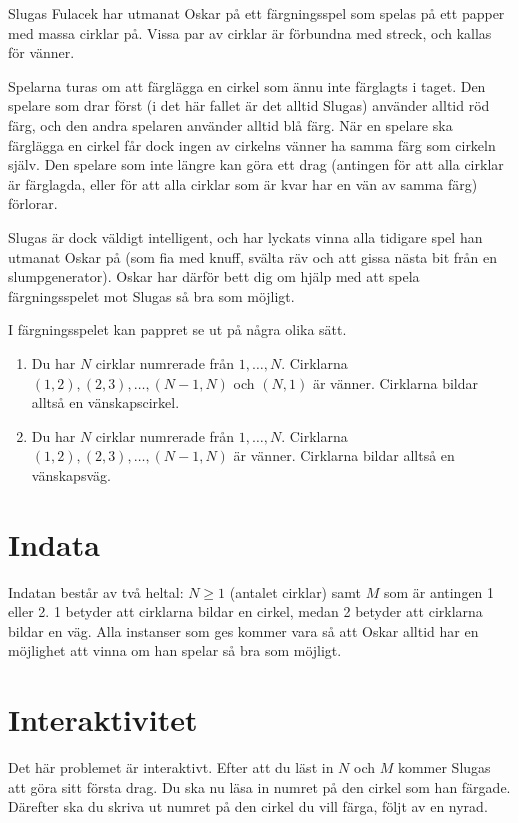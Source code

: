 
Slugas Fulacek har utmanat Oskar på ett färgningsspel som spelas på ett papper med massa cirklar på. Vissa par av cirklar är förbundna med streck, och kallas för vänner.

Spelarna turas om att färglägga en cirkel som ännu inte färglagts i taget. Den spelare som drar först (i det här fallet är det alltid Slugas) använder alltid röd färg, och den andra spelaren använder alltid blå färg. När en spelare ska färglägga en cirkel får dock ingen av cirkelns vänner ha samma färg som cirkeln själv. Den spelare som inte längre kan göra ett drag (antingen för att alla cirklar är färglagda, eller för att alla cirklar som är kvar har en vän av samma färg) förlorar.

Slugas är dock väldigt intelligent, och har lyckats vinna alla tidigare spel han utmanat Oskar på (som fia med knuff, svälta räv och att gissa nästa bit från en slumpgenerator). Oskar har därför bett dig om hjälp med att spela färgningsspelet mot Slugas så bra som möjligt.

I färgningsspelet kan pappret se ut på några olika sätt.

\begin{enumerate}
\item Du har $N$ cirklar numrerade från $1, \dots, N$. Cirklarna $(1, 2), (2, 3), \dots, (N-1, N)$ och $(N, 1)$ är vänner. Cirklarna bildar alltså en vänskapscirkel.
\item Du har $N$ cirklar numrerade från $1, \dots, N$. Cirklarna $(1, 2), (2, 3), \dots, (N-1, N)$ är vänner. Cirklarna bildar alltså en vänskapsväg.
\end{enumerate}

\section*{Indata}

Indatan består av två heltal: $N \ge 1$ (antalet cirklar) samt $M$ som är antingen 1 eller 2. 1 betyder att cirklarna bildar en cirkel, medan 2 betyder att cirklarna bildar en väg. Alla instanser som ges kommer vara så att Oskar alltid har en möjlighet att vinna om han spelar så bra som möjligt.

\section*{Interaktivitet}
Det här problemet är interaktivt. Efter att du läst in $N$ och $M$ kommer Slugas att göra sitt första drag. Du ska nu läsa in numret på den cirkel som han färgade. Därefter ska du skriva ut numret på den cirkel du vill färga, följt av en nyrad.

